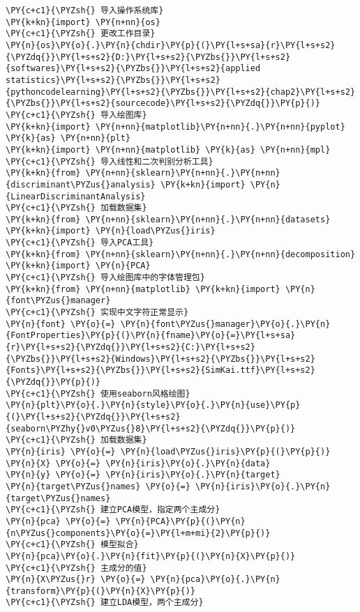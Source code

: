 \begin{Verbatim}[commandchars=\\\{\}]
\PY{c+c1}{\PYZsh{} 导入操作系统库}
\PY{k+kn}{import} \PY{n+nn}{os}
\PY{c+c1}{\PYZsh{} 更改工作目录}
\PY{n}{os}\PY{o}{.}\PY{n}{chdir}\PY{p}{(}\PY{l+s+sa}{r}\PY{l+s+s2}{\PYZdq{}}\PY{l+s+s2}{D:}\PY{l+s+s2}{\PYZbs{}}\PY{l+s+s2}{softwares}\PY{l+s+s2}{\PYZbs{}}\PY{l+s+s2}{applied statistics}\PY{l+s+s2}{\PYZbs{}}\PY{l+s+s2}{pythoncodelearning}\PY{l+s+s2}{\PYZbs{}}\PY{l+s+s2}{chap2}\PY{l+s+s2}{\PYZbs{}}\PY{l+s+s2}{sourcecode}\PY{l+s+s2}{\PYZdq{}}\PY{p}{)}
\PY{c+c1}{\PYZsh{} 导入绘图库}
\PY{k+kn}{import} \PY{n+nn}{matplotlib}\PY{n+nn}{.}\PY{n+nn}{pyplot} \PY{k}{as} \PY{n+nn}{plt}
\PY{k+kn}{import} \PY{n+nn}{matplotlib} \PY{k}{as} \PY{n+nn}{mpl}
\PY{c+c1}{\PYZsh{} 导入线性和二次判别分析工具}
\PY{k+kn}{from} \PY{n+nn}{sklearn}\PY{n+nn}{.}\PY{n+nn}{discriminant\PYZus{}analysis} \PY{k+kn}{import} \PY{n}{LinearDiscriminantAnalysis}
\PY{c+c1}{\PYZsh{} 加载数据集}
\PY{k+kn}{from} \PY{n+nn}{sklearn}\PY{n+nn}{.}\PY{n+nn}{datasets} \PY{k+kn}{import} \PY{n}{load\PYZus{}iris}
\PY{c+c1}{\PYZsh{} 导入PCA工具}
\PY{k+kn}{from} \PY{n+nn}{sklearn}\PY{n+nn}{.}\PY{n+nn}{decomposition} \PY{k+kn}{import} \PY{n}{PCA}
\PY{c+c1}{\PYZsh{} 导入绘图库中的字体管理包}
\PY{k+kn}{from} \PY{n+nn}{matplotlib} \PY{k+kn}{import} \PY{n}{font\PYZus{}manager}
\PY{c+c1}{\PYZsh{} 实现中文字符正常显示}
\PY{n}{font} \PY{o}{=} \PY{n}{font\PYZus{}manager}\PY{o}{.}\PY{n}{FontProperties}\PY{p}{(}\PY{n}{fname}\PY{o}{=}\PY{l+s+sa}{r}\PY{l+s+s2}{\PYZdq{}}\PY{l+s+s2}{C:}\PY{l+s+s2}{\PYZbs{}}\PY{l+s+s2}{Windows}\PY{l+s+s2}{\PYZbs{}}\PY{l+s+s2}{Fonts}\PY{l+s+s2}{\PYZbs{}}\PY{l+s+s2}{SimKai.ttf}\PY{l+s+s2}{\PYZdq{}}\PY{p}{)}
\PY{c+c1}{\PYZsh{} 使用seaborn风格绘图}
\PY{n}{plt}\PY{o}{.}\PY{n}{style}\PY{o}{.}\PY{n}{use}\PY{p}{(}\PY{l+s+s2}{\PYZdq{}}\PY{l+s+s2}{seaborn\PYZhy{}v0\PYZus{}8}\PY{l+s+s2}{\PYZdq{}}\PY{p}{)}
\PY{c+c1}{\PYZsh{} 加载数据集}
\PY{n}{iris} \PY{o}{=} \PY{n}{load\PYZus{}iris}\PY{p}{(}\PY{p}{)}
\PY{n}{X} \PY{o}{=} \PY{n}{iris}\PY{o}{.}\PY{n}{data}
\PY{n}{y} \PY{o}{=} \PY{n}{iris}\PY{o}{.}\PY{n}{target}
\PY{n}{target\PYZus{}names} \PY{o}{=} \PY{n}{iris}\PY{o}{.}\PY{n}{target\PYZus{}names}
\PY{c+c1}{\PYZsh{} 建立PCA模型，指定两个主成分}
\PY{n}{pca} \PY{o}{=} \PY{n}{PCA}\PY{p}{(}\PY{n}{n\PYZus{}components}\PY{o}{=}\PY{l+m+mi}{2}\PY{p}{)}
\PY{c+c1}{\PYZsh{} 模型拟合}
\PY{n}{pca}\PY{o}{.}\PY{n}{fit}\PY{p}{(}\PY{n}{X}\PY{p}{)}
\PY{c+c1}{\PYZsh{} 主成分的值}
\PY{n}{X\PYZus{}r} \PY{o}{=} \PY{n}{pca}\PY{o}{.}\PY{n}{transform}\PY{p}{(}\PY{n}{X}\PY{p}{)}
\PY{c+c1}{\PYZsh{} 建立LDA模型，两个主成分}

\end{Verbatim}
